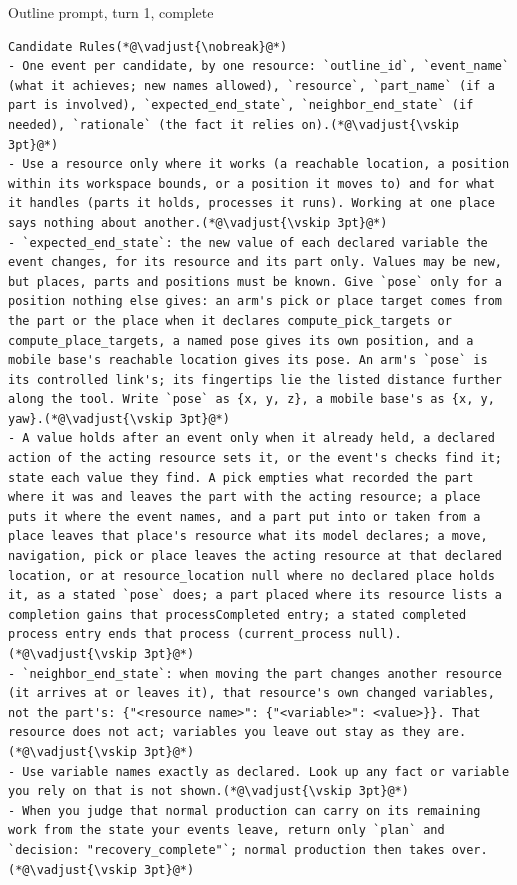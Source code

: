 \documentclass[preprint,12pt,authoryear]{elsarticle}
\begin{document}
\begin{fullbox}{Outline prompt, turn 1, complete}
\begin{lstlisting}[showlines=true]
Candidate Rules(*@\vadjust{\nobreak}@*)
- One event per candidate, by one resource: `outline_id`, `event_name` (what it achieves; new names allowed), `resource`, `part_name` (if a part is involved), `expected_end_state`, `neighbor_end_state` (if needed), `rationale` (the fact it relies on).(*@\vadjust{\vskip 3pt}@*)
- Use a resource only where it works (a reachable location, a position within its workspace bounds, or a position it moves to) and for what it handles (parts it holds, processes it runs). Working at one place says nothing about another.(*@\vadjust{\vskip 3pt}@*)
- `expected_end_state`: the new value of each declared variable the event changes, for its resource and its part only. Values may be new, but places, parts and positions must be known. Give `pose` only for a position nothing else gives: an arm's pick or place target comes from the part or the place when it declares compute_pick_targets or compute_place_targets, a named pose gives its own position, and a mobile base's reachable location gives its pose. An arm's `pose` is its controlled link's; its fingertips lie the listed distance further along the tool. Write `pose` as {x, y, z}, a mobile base's as {x, y, yaw}.(*@\vadjust{\vskip 3pt}@*)
- A value holds after an event only when it already held, a declared action of the acting resource sets it, or the event's checks find it; state each value they find. A pick empties what recorded the part where it was and leaves the part with the acting resource; a place puts it where the event names, and a part put into or taken from a place leaves that place's resource what its model declares; a move, navigation, pick or place leaves the acting resource at that declared location, or at resource_location null where no declared place holds it, as a stated `pose` does; a part placed where its resource lists a completion gains that processCompleted entry; a stated completed process entry ends that process (current_process null).(*@\vadjust{\vskip 3pt}@*)
- `neighbor_end_state`: when moving the part changes another resource (it arrives at or leaves it), that resource's own changed variables, not the part's: {"<resource name>": {"<variable>": <value>}}. That resource does not act; variables you leave out stay as they are.(*@\vadjust{\vskip 3pt}@*)
- Use variable names exactly as declared. Look up any fact or variable you rely on that is not shown.(*@\vadjust{\vskip 3pt}@*)
- When you judge that normal production can carry on its remaining work from the state your events leave, return only `plan` and `decision: "recovery_complete"`; normal production then takes over.(*@\vadjust{\vskip 3pt}@*)


\end{lstlisting}
\end{fullbox}
\end{document}
